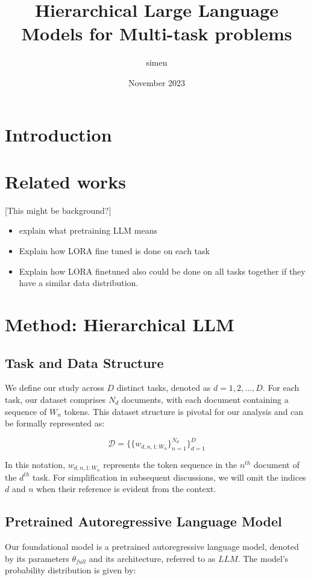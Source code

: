 \documentclass{article}
\title{Hierarchical Large Language Models for Multi-task problems}
\author{simen }
\date{November 2023}
\begin{document}
\maketitle

\section{Introduction}

\section{Related works}
[This might be background?]
\begin{itemize}
    \item explain what pretraining LLM means
    \item Explain how LORA fine tuned is done on each task
    \item Explain how LORA finetuned also could be done on all tasks together if they have a similar data distribution.
\end{itemize}


\section{Method: Hierarchical LLM}

\subsection{Task and Data Structure}
We define our study across $D$ distinct tasks, denoted as $d=1,2,...,D$. For each task, our dataset comprises $N_d$ documents, with each document containing a sequence of $W_n$ tokens. This dataset structure is pivotal for our analysis and can be formally represented as:

\begin{equation} \label{eq:data}
\mathcal{D} = \{ \{ w_{d,n,1:W_n} \}_{n=1}^{N_d} \}_{d=1}^D
\end{equation}

In this notation, $w_{d,n,1:W_n}$ represents the token sequence in the $n^{th}$ document of the $d^{th}$ task. For simplification in subsequent discussions, we will omit the indices $d$ and $n$ when their reference is evident from the context.

\subsection{Pretrained Autoregressive Language Model}
Our foundational model is a pretrained autoregressive language model, denoted by its parameters $\theta_{full}$ and its architecture, referred to as $LLM$. The model's probability distribution is given by:
\end{document}
